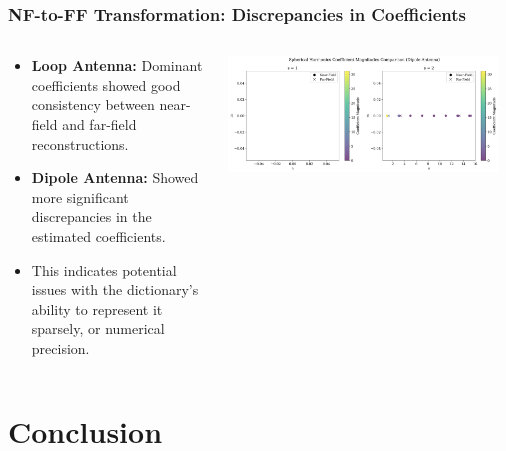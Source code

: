 \documentclass{beamer}
\begin{document}
\begin{frame}
    \frametitle{NF-to-FF Transformation: Discrepancies in Coefficients}
    \begin{columns}
        \begin{column}{0.5\textwidth}
            \begin{itemize}
                \item \textbf{Loop Antenna:} Dominant coefficients showed good consistency between near-field and far-field reconstructions.
                \item \textbf{Dipole Antenna:} Showed more significant discrepancies in the estimated coefficients.
                \item This indicates potential issues with the dictionary's ability to represent it sparsely, or numerical precision.
            \end{itemize}
        \end{column}
        \begin{column}{0.5\textwidth}
            \centering
            \includegraphics[width=0.95\textwidth]{Figures/dipole_nf_ff_weights.png}
            \label{fig:dipole_nfff_weights}
        \end{column}
    \end{columns}
\end{frame}


\section{Conclusion}
\end{document}

